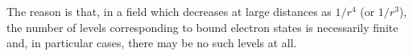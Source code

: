 The reason is that, in a field which decreases at large distances as $1/r^4$ (or $1/r^3$), the number of levels corresponding to bound electron states is necessarily finite and, in particular cases, there may be no such levels at all.
